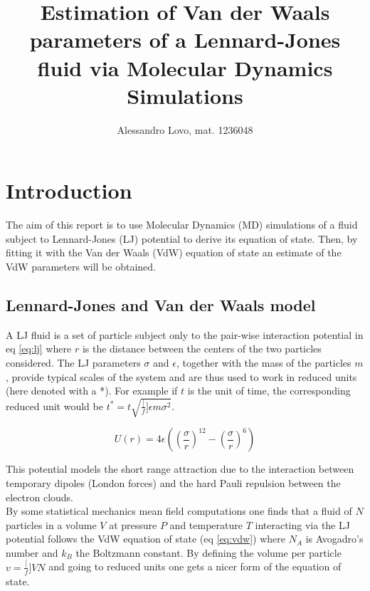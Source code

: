 \documentclass[a4paper, 11pt]{article}
\begin{document}
\title{Estimation of Van der Waals parameters of a Lennard-Jones fluid via Molecular Dynamics Simulations}
\author{Alessandro Lovo, mat. 1236048}

\maketitle

\section{Introduction}
  The aim of this report is to use Molecular Dynamics (MD) simulations of a fluid subject to Lennard-Jones (LJ) potential to derive its equation of state. Then, by fitting it with the Van der Waals (VdW) equation of state an estimate of the VdW parameters will be obtained.

  \subsection{Lennard-Jones and Van der Waals model}
    A LJ fluid is a set of particle subject only to the pair-wise interaction potential in eq \ref{eq:lj} where $r$ is the distance between the centers of the two particles considered. The LJ parameters $\sigma$ and $\epsilon$, together with the mass of the particles $m$, provide typical scales of the system and are thus used to work in reduced units (here denoted with a *). For example if $t$ is the unit of time, the corresponding reduced unit would be $t^* = t \sqrt{\frac[f]{\epsilon}{m\sigma^2}}$.

    \begin{equation} \label{eq:lj}
      U(r) = 4\epsilon\left(\left(\frac{\sigma}{r} \right)^{12} - \left(\frac{\sigma}{r} \right)^6 \right)
    \end{equation}

    This potential models the short range attraction due to the interaction between temporary dipoles (London forces) and the hard Pauli repulsion between the electron clouds.\\
    By some statistical mechanics mean field computations one finds that a fluid of $N$ particles in a volume $V$ at pressure $P$ and temperature $T$ interacting via the LJ potential follows the VdW equation of state (eq \ref{eq:vdw}) where $N_A$ is Avogadro's number and $k_B$ the Boltzmann constant. By defining the volume per particle $v = \frac[f]{V}{N}$ and going to reduced units one gets a nicer form of the equation of state.
\end{document}
